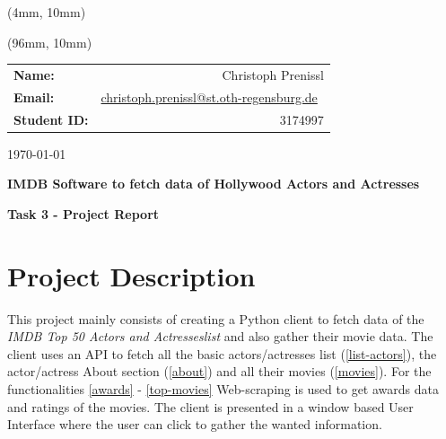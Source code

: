 \documentclass[12pt]{article}
\author{Christoph Prenissl}
\date{\today}
\begin{document}
\begin{titlepage}

      \begin{textblock*}{200mm}(4mm, 10mm)
            \begin{figure}
                  \def\svgscale{0.6}
                  
            \end{figure}
      \end{textblock*}

      \begin{textblock*}{200mm}(96mm, 10mm)
            \begin{tabular}[h]{lr}
                  \textbf{Name:}       & Christoph Prenissl                                                                              \\
                  \textbf{Email:}      & \href{mailto:christoph.prenissl@st.oth-regensburg.de}{christoph.prenissl@st.oth-regensburg.de}\ \\
                  \textbf{Student ID:} & 3174997                                                                                         \\
            \end{tabular}
      \end{textblock*}

      \begin{flushright}
            \today
      \end{flushright}

      \vspace{2cm}

      \begin{center}
            \textbf{\Large{IMDB Software to fetch data of Hollywood Actors and Actresses}}

            \vspace{6cm}

            \textbf{Task 3 - Project Report}

            \vspace{10cm}
      \end{center}
\end{titlepage}

\newpage

\tableofcontents

\newpage

\section{Project Description}
This project mainly consists of creating a Python client to fetch data of the 
\textit{IMDB Top 50 Actors and Actresseslist} and also gather their movie data. 
The client uses an API to fetch all the basic actors/actresses list (\ref{list-actors}),
the actor/actress About section (\ref{about}) and all their movies (\ref{movies}).
For the functionalities \ref{awards} - \ref{top-movies} Web-scraping is used to 
get awards data and ratings of the movies.
The client is presented in a window based User Interface where the user 
can click to gather the wanted information.
\end{document}
